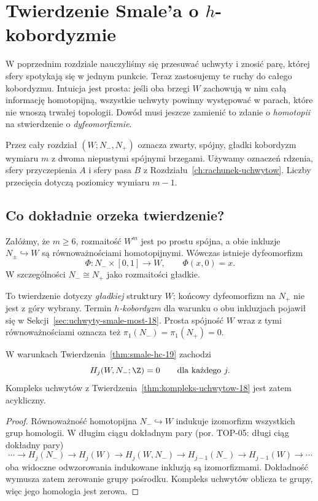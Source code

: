 \chapter{Twierdzenie Smale'a o \texorpdfstring{$h$}{h}-kobordyzmie}
\label{ch:hcobordyzm}

\providecommand{\atlasref}[2]{#2}

W poprzednim rozdziale nauczyliśmy się
przesuwać uchwyty i znosić parę, której
sfery spotykają się w jednym punkcie.
Teraz zastosujemy te ruchy do całego
kobordyzmu. Intuicja jest prosta:
jeśli oba brzegi $W$ zachowują w nim
całą informację homotopijną, wszystkie
uchwyty powinny występować w parach,
które nie wnoszą trwałej topologii.
Dowód musi jeszcze zamienić to zdanie
o \emph{homotopii} na stwierdzenie
o \emph{dyfeomorfizmie}.

Przez cały rozdział $(W;N_-,N_+)$
oznacza zwarty, spójny, gładki
kobordyzm wymiaru $m$ z dwoma
niepustymi spójnymi brzegami.
Używamy oznaczeń rdzenia, sfery
przyczepienia $A$ i sfery pasa $B$
z Rozdziału~\ref{ch:rachunek-uchwytow}.
Liczby przecięcia dotyczą poziomicy
wymiaru $m-1$.

\section{Co dokładnie orzeka twierdzenie?}
\label{sec:stwierdzenie-hc-19}

\begin{twierdzenie}
\label{thm:smale-hc-19}
Załóżmy, że $m\geq6$, rozmaitość
$W^m$ jest po prostu spójna, a obie
inkluzje $N_\pm\hookrightarrow W$
są równoważnościami homotopijnymi.
Wówczas istnieje dyfeomorfizm
\[
 \Phi:N_-\times[0,1]\longrightarrow W,
 \qquad \Phi(x,0)=x.
\]
W szczególności $N_-\cong N_+$
jako rozmaitości gładkie.
\end{twierdzenie}

To twierdzenie dotyczy \emph{gładkiej}
struktury $W$; końcowy dyfeomorfizm
na $N_+$ nie jest z góry wybrany.
Termin \emph{$h$-kobordyzm} dla
warunku o obu inkluzjach pojawił się
w Sekcji~\ref{sec:uchwyty-smale-most-18}.
Prosta spójność $W$ wraz z tymi
równoważnościami oznacza też
$\pi_1(N_-)=\pi_1(N_+)=0$.

\begin{stwierdzenie}[Acykliczność]
\label{prop:acykliczny-hc-19}
W warunkach
Twierdzenia~\ref{thm:smale-hc-19}
zachodzi
\[
 H_j(W,N_-;\Z)=0
 \qquad\text{dla każdego }j.
\]
Kompleks uchwytów z
Twierdzenia~\ref{thm:kompleks-uchwytow-18}
jest zatem acykliczny.
\end{stwierdzenie}
\begin{proof}
Równoważność homotopijna
$N_-\hookrightarrow W$ indukuje
izomorfizm wszystkich grup homologii.
W długim ciągu dokładnym pary (por. \atlasref{TOP-05::thm:les-pary}{TOP-05: długi ciąg dokładny pary})
\[
 \cdots\to H_j(N_-)\to H_j(W)
 \to H_j(W,N_-)\to H_{j-1}(N_-)
 \to H_{j-1}(W)\to\cdots
\]
oba widoczne odwzorowania indukowane inkluzją
są izomorfizmami. Dokładność wymusza
zatem zerowanie grupy pośrodku.
Kompleks uchwytów oblicza te grupy,
więc jego homologia jest zerowa.
\end{proof}

